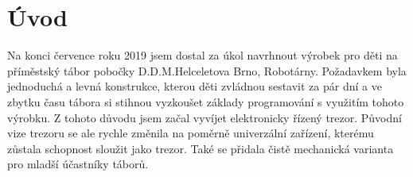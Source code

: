 \chapter*{Úvod}

Na konci července roku 2019 jsem dostal za úkol navrhnout výrobek pro děti na příměstský tábor pobočky D.D.M.Helceletova Brno, Robotárny. %
 Poža\-dav\-kem 
byla jednoduchá a levná konstrukce, kterou děti zvládnou sestavit za pár dní a ve zbytku času tábora si stihnou vyzkoušet základy programování 
s využitím tohoto výrobku. Z tohoto důvodu jsem začal vyvíjet elektronicky řízený trezor. Původní vize trezoru se ale rychle změnila na poměrně 
univerzální zařízení, kterému zůstala schopnost sloužit jako trezor. Také se přidala čistě mechanická varianta pro mladší účastníky táborů.




\newpage